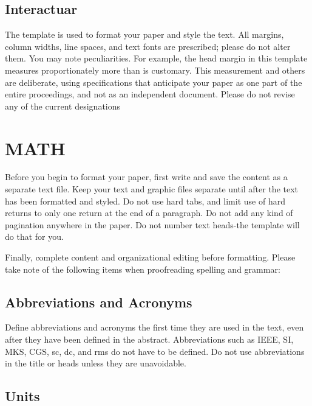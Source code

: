 \documentclass[spanish, letterpaper, 12 pt, conference]{ieeeconf}  %
\begin{document}
\subsection{Interactuar}

The template is used to format your paper and style the text. All margins, column widths, line spaces, and text fonts are prescribed; please do not alter them. You may note peculiarities. For example, the head margin in this template measures proportionately more than is customary. This measurement and others are deliberate, using specifications that anticipate your paper as one part of the entire proceedings, and not as an independent document. Please do not revise any of the current designations

\section{MATH}

Before you begin to format your paper, first write and save the content as a separate text file. Keep your text and graphic files separate until after the text has been formatted and styled. Do not use hard tabs, and limit use of hard returns to only one return at the end of a paragraph. Do not add any kind of pagination anywhere in the paper. Do not number text heads-the template will do that for you.

Finally, complete content and organizational editing before formatting. Please take note of the following items when proofreading spelling and grammar:

\subsection{Abbreviations and Acronyms} Define abbreviations and acronyms the first time they are used in the text, even after they have been defined in the abstract. Abbreviations such as IEEE, SI, MKS, CGS, sc, dc, and rms do not have to be defined. Do not use abbreviations in the title or heads unless they are unavoidable.

\subsection{Units}
\end{document}
